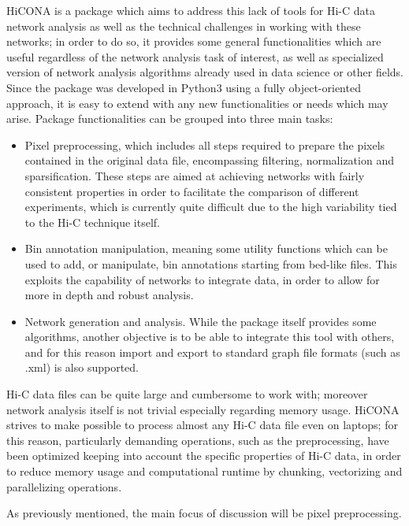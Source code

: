 HiCONA is a package which aims to address this lack of tools for Hi-C data network analysis as well as the technical challenges in working with these networks; in order to do so, it provides some general functionalities which are useful regardless of the network analysis task of interest, as well as specialized version of network analysis algorithms already used in data science or other fields. Since the package was developed in Python3 using a fully object-oriented approach, it is easy to extend with any new functionalities or needs which may arise. Package functionalities can be grouped into three main tasks:
\begin{itemize}\tightlist
  \item Pixel preprocessing, which includes all steps required to prepare the pixels contained in the original data file, encompassing filtering, normalization and sparsification. These steps are aimed at achieving networks with fairly consistent properties in order to facilitate the comparison of different experiments, which is currently quite difficult due to the high variability tied to the Hi-C technique itself.
  \item Bin annotation manipulation, meaning some utility functions which can be used to add, or manipulate, bin annotations starting from bed-like files. This exploits the capability of networks to integrate data, in order to allow for more in depth and robust analysis. 
  \item Network generation and analysis. While the package itself provides some algorithms, another objective is to be able to integrate this tool with others, and for this reason import and export to standard graph file formats (such as .xml) is also supported.  
\end{itemize}

Hi-C data files can be quite large and cumbersome to work with; moreover network analysis itself is not trivial especially regarding memory usage. HiCONA strives to make possible to process almost any Hi-C data file even on laptops; for this reason, particularly demanding operations, such as the preprocessing, have been optimized keeping into account the specific properties of Hi-C data, in order to reduce memory usage and computational runtime by chunking, vectorizing and parallelizing operations.

As previously mentioned, the main focus of discussion will be pixel preprocessing.
